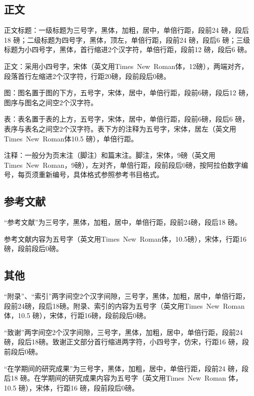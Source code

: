 \documentclass[twoside,longtitle]{LZUthesis}
\begin{document}
\subsection{正文}

正文标题：一级标题为三号字，黑体，加粗，居中，单倍行距，段前24 磅，段后18 磅；二级标题为四号字，黑体，顶左，单倍行距，段前24 磅，段后6 磅；三级标题为小四号字，黑体，首行缩进2个汉字符，单倍行距，段前12 磅，段后6 磅。

正文：采用小四号字，宋体（英文用Times~New~Roman体，12磅），两端对齐，段落首行左缩进2个汉字符，行距20磅，段前段后0磅。

图：图名置于图的下方，五号字，宋体，居中，单倍行距，段前6磅，段后12 磅，图序与图名之间空2个汉字符。

表：表名置于表的上方，五号字，宋体，居中，单倍行距，段前6磅，段后6 磅，表序与表名之间空2个汉字符。表下方的注释为五号字，宋体，居左（英文用Times~New~Roman体10.5 磅），单倍行距。

注释：一般分为页末注（脚注）和篇末注。脚注，宋体，9磅（英文用Times~New~Roman，9磅），左对齐，单倍行距，段前段后0磅，按阿拉伯数字编号，每页须重新编号，具体格式参照参考书目格式。


\subsection{参考文献}

“参考文献”为三号字，黑体，加粗，居中，单倍行距，段前24磅，段后18 磅。

参考文献内容为五号字（英文用Times~New~Roman体，10.5磅），宋体，行距16 磅，段前段后0磅。


\subsection{其他}

“附录”、“索引”两字间空2个汉字间隙，三号字，黑体，加粗，居中，单倍行距，段前24磅，段后18磅。附录、索引的内容为五号字（英文用Times~New~Roman体，10.5 磅），宋体，行距16磅，段前段后0磅。

“致谢”两字间空2个汉字间隙，三号字，黑体，加粗，居中，单倍行距，段前24 磅，段后18磅。致谢正文部分首行缩进两字符，小四号字，仿宋，行距16 磅，段前段后0磅。

“在学期间的研究成果”为三号字，黑体，加粗，居中，单倍行距，段前24 磅，段后18 磅。在学期间的研究成果内容为五号字（英文用Times~New~Roman 体，10.5 磅），宋体，行距16 磅，段前段后0磅。
\end{document}
